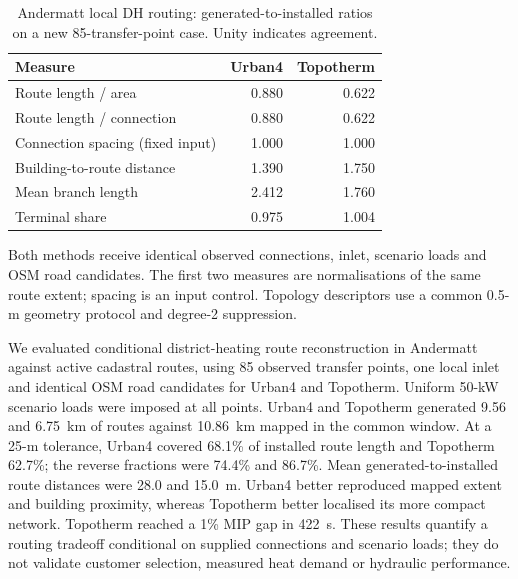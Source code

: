 \begin{table}[t]
\caption{Andermatt local DH routing: generated-to-installed ratios on a new 85-transfer-point case. Unity indicates agreement.}
\label{tab:andermatt_topotherm_accuracy}
\centering
\footnotesize
\begin{tabular}{lrr}
\hline
Measure & Urban4 & Topotherm \\
\hline
Route length / area & 0.880 & 0.622 \\
Route length / connection & 0.880 & 0.622 \\
Connection spacing (fixed input) & 1.000 & 1.000 \\
Building-to-route distance & 1.390 & 1.750 \\
Mean branch length & 2.412 & 1.760 \\
Terminal share & 0.975 & 1.004 \\
\hline
\end{tabular}

\vspace{2pt}
\parbox{\columnwidth}{\scriptsize Both methods receive identical observed connections, inlet, scenario loads and OSM road candidates. The first two measures are normalisations of the same route extent; spacing is an input control. Topology descriptors use a common 0.5-m geometry protocol and degree-2 suppression.}
\end{table}

We evaluated conditional district-heating route reconstruction in Andermatt against active cadastral routes, using 85 observed transfer points, one local inlet and identical OSM road candidates for Urban4 and Topotherm. Uniform 50-kW scenario loads were imposed at all points. Urban4 and Topotherm generated 9.56 and 6.75~km of routes against 10.86~km mapped in the common window. At a 25-m tolerance, Urban4 covered 68.1\% of installed route length and Topotherm 62.7\%; the reverse fractions were 74.4\% and 86.7\%. Mean generated-to-installed route distances were 28.0 and 15.0~m. Urban4 better reproduced mapped extent and building proximity, whereas Topotherm better localised its more compact network. Topotherm reached a 1\% MIP gap in 422~s. These results quantify a routing tradeoff conditional on supplied connections and scenario loads; they do not validate customer selection, measured heat demand or hydraulic performance.

